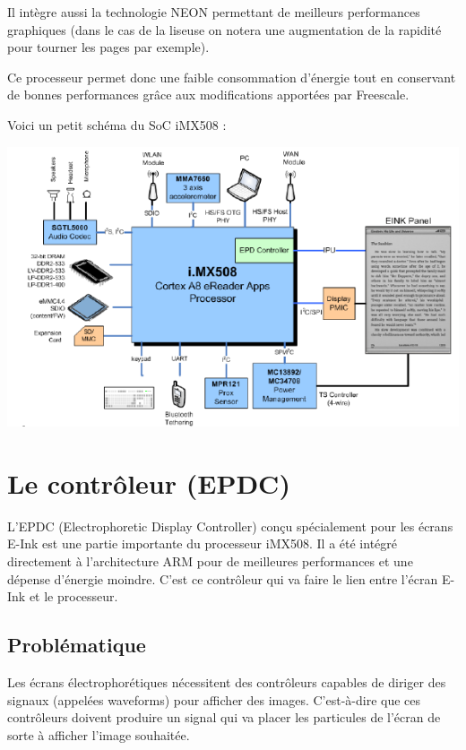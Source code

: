 Il intègre aussi la technologie NEON permettant de meilleurs performances graphiques (dans le cas de la liseuse on notera une augmentation de la rapidité pour tourner les pages par exemple).

Ce processeur permet donc une faible consommation d’énergie tout en conservant de bonnes performances grâce aux modifications apportées par Freescale.


Voici un petit schéma du SoC iMX508 :

\begin{center}
	\includegraphics{iMX508.png}
\end{center}


\section{Le contrôleur (EPDC)}

L'EPDC (Electrophoretic Display Controller) conçu spécialement pour les écrans E-Ink est une partie importante du processeur iMX508. Il a été intégré directement à l'architecture ARM pour de meilleures performances et une dépense d'énergie moindre. C'est ce contrôleur qui va faire le lien entre l'écran E-Ink et le processeur.

\subsection{Problématique}

Les écrans électrophorétiques nécessitent des contrôleurs capables de diriger des signaux (appelées waveforms) pour afficher des images. C'est-à-dire que ces contrôleurs doivent produire un signal qui va placer les particules de l'écran de sorte à afficher l'image souhaitée.

